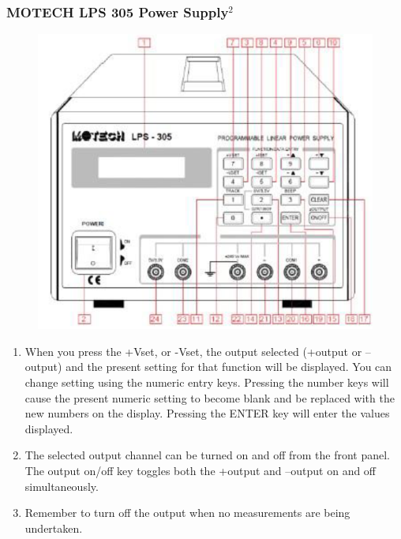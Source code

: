 \documentclass[12pt]{article}
\begin{document}
\subsubsection{MOTECH LPS 305 Power Supply$^2$}
\begin{figure}[H]
\centering
\includegraphics[scale=0.5]{P1.jpg}
\end{figure}
\begin{enumerate}
\item When you press the +Vset, or -Vset, the output selected (+output or –output) and the present setting for that function will be displayed. You can change setting using the numeric entry keys. Pressing the number keys will cause the present numeric setting to become blank and be replaced with the new numbers on the display. Pressing the ENTER key will enter the values displayed.
\item The selected output channel can be turned on and off from the front panel. The output on/off key toggles both the +output and –output on and off simultaneously.
\item Remember to turn off the output when no measurements are being undertaken.
\end{enumerate}
\end{document}
